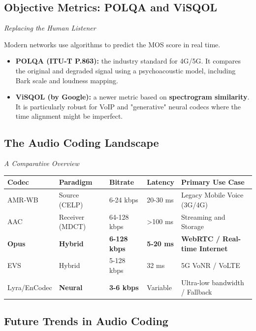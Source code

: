 \subsection{Objective Metrics: POLQA and ViSQOL}

\textit{Replacing the Human Listener}

Modern networks use algorithms to predict the MOS score in real time.

\begin{itemize}
\item \textbf{POLQA (ITU-T P.863):} the industry standard for 4G/5G. It compares the original and degraded signal using a psychoacoustic model, including Bark scale and loudness mapping.
\item \textbf{ViSQOL (by Google):} a newer metric based on \textbf{spectrogram similarity}. It is particularly robust for VoIP and "generative" neural codecs where the time alignment might be imperfect.
\end{itemize}

\subsection{The Audio Coding Landscape}

\textit{A Comparative Overview}

\begin{center}
\begin{tabular}{|l|l|l|l|l|}
\hline
\textbf{Codec} & \textbf{Paradigm} & \textbf{Bitrate} & \textbf{Latency} & \textbf{Primary Use Case} \\ \hline
AMR-WB & Source (CELP) & 6-24 kbps & 20-30 ms & Legacy Mobile Voice (3G/4G) \\ \hline
AAC & Receiver (MDCT) & 64-128 kbps & \textgreater{}100 ms & Streaming and Storage \\ \hline
\textbf{Opus} & \textbf{Hybrid} & \textbf{6-128 kbps} & \textbf{5-20 ms} & \textbf{WebRTC / Real-time Internet} \\ \hline
EVS & Hybrid & 5-128 kbps & 32 ms & 5G VoNR / VoLTE \\ \hline
Lyra/EnCodec & \textbf{Neural} & \textbf{3-6 kbps} & Variable & Ultra-low bandwidth / Fallback \\ \hline
\end{tabular}
\end{center}

\subsection{Future Trends in Audio Coding}

